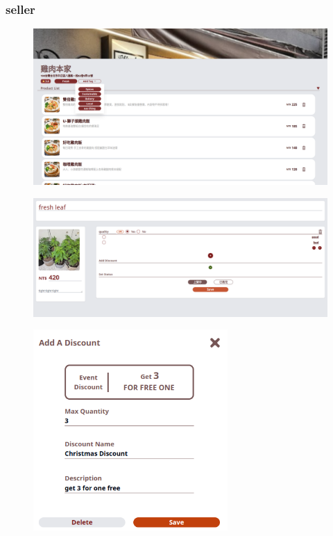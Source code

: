 \documentclass[a4paper, 12pt]{article}
\begin{document}
\subsubsection{seller}
\begin{figure}[hp]
    \centerline{\includegraphics[width=40em]{gui-snapshot/seller/store-edit.png}}
    \label{fig:enter-label}
\end{figure}
\newline
{}
\begin{figure}[hp]
    \centerline{\includegraphics[width=40em]{gui-snapshot/seller/item.png}}
    \label{fig:enter-label}
\end{figure}
\newpage
{}
\begin{figure}[hp]
    \centerline{\includegraphics[width=20em]{gui-snapshot/seller/discount.png}}
    \label{fig:enter-label}
\end{figure}
\end{document}
